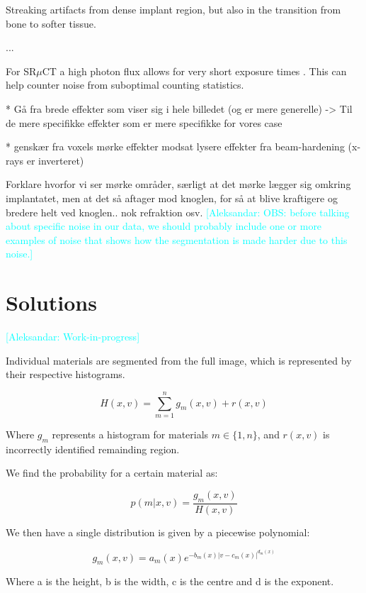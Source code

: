 \documentclass[times,twocolumn,final]{elsarticle}
\newcommand{\aleksandar}[1]{\textcolor{cyan}{[Aleksandar: #1]}}
\begin{document}
Streaking artifacts from dense implant region, but also in the transition from bone to softer tissue.

...

For SR$\mu$CT a high photon flux allows for very short exposure times \citep{srexptime}.
This can help counter noise from suboptimal counting statistics\citep{srnoise}.


* Gå fra brede effekter som viser sig i hele billedet (og er mere generelle) -> Til de mere specifikke effekter som er mere specifikke for vores case

* genskær fra voxels
mørke effekter modsat lysere effekter fra beam-hardening (x-rays er inverteret)

Forklare hvorfor vi ser mørke områder, særligt at det mørke lægger sig omkring implantatet,
men at det så aftager mod knoglen, for så at blive kraftigere og bredere helt ved knoglen..
nok refraktion osv. \aleksandar{OBS: before talking about specific noise in our data, we should probably include one or more examples of noise that shows how the segmentation is made harder due to this noise.}


\section*{Solutions}

\aleksandar{Work-in-progress}

Individual materials are segmented from the full image, which is represented by their respective histograms.

\begin{equation}
H(x,v) = \sum_{m=1}^{n} g_{m}(x,v) + r(x,v)
\end{equation}

Where $g_m$ represents a histogram for materials $m\in\{1,n\}$, and $r(x,v)$ is incorrectly identified remainding region.

We find the probability for a certain material as:

\begin{equation}
p(m|x,v) = \frac{g_{m}(x,v)}{H(x,v)}
\end{equation}

We then have a single distribution is given by a piecewise polynomial:

\begin{equation}
g_{m}(x,v) = a_{m}(x) e^{ -b_{m}(x) |v-c_{m}(x)|^{d_{m}(x)} }
\end{equation}

Where a is the height, b is the width, c is the centre and d is the exponent.
\end{document}
